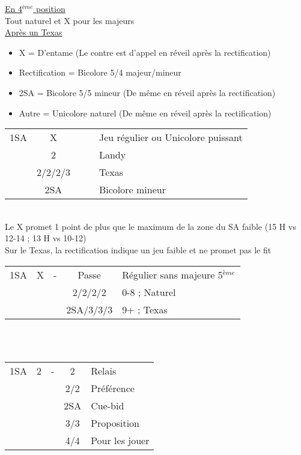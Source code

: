 \documentclass[a4paper, oneside, 11pt]{report}
\begin{document}
	\underline{En 4$^{ème}$ position}\\
	Tout naturel et X pour les majeurs\\

	\underline{Après un Texas}
	
	\begin{itemize}
	\item X = D'entame (Le contre est d'appel en réveil après la rectification)
	\item Rectification = Bicolore 5/4 majeur/mineur
	\item 2SA = Bicolore 5/5 mineur (De même en réveil après la rectification)
	\item Autre = Unicolore naturel (De même en réveil après la rectification)\\
	\end{itemize}

	\begin{tabular}{cccc|l}
	1SA & X &&& Jeu régulier ou Unicolore puissant\\
	& 2\trefle &&& Landy\\
	& 2\carreau/2\coeur/2\pique/3\trefle &&& Texas\\
	& 2SA &&& Bicolore mineur\\
	\end{tabular}\\
	Le X promet 1 point de plus que le maximum de la zone du SA faible (15 H vs 12-14 ; 13 H vs 10-12)\\
	Sur le Texas, la rectification indique un jeu faible et ne promet pas le fit\\

	\begin{tabular}{cccc|l}
	1SA & X & - & Passe & Régulier sans majeure 5$^{ème}$\\
	&&& 2\trefle/2\carreau/2\coeur/2\pique & 0-8 ; Naturel\\
	&&& 2SA/3\trefle/3\carreau/3\coeur & 9+ ; Texas\\
	\end{tabular}\\\\

	\begin{tabular}{cccc|l}
	1SA & 2\trefle & - & 2\carreau & Relais\\
	&&& 2\coeur/2\pique & Préférence\\
	&&& 2SA & Cue-bid\\
	&&& 3\coeur/3\pique & Proposition\\
	&&& 4\coeur/4\pique & Pour les jouer\\
	\end{tabular}\\\\
\end{document}
